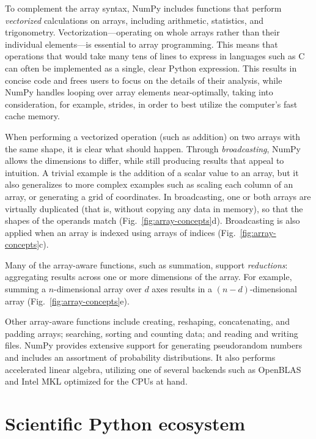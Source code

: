 To complement the array syntax, NumPy includes functions that perform
\emph{vectorized} calculations on arrays, including arithmetic, statistics, and
trigonometry.
Vectorization---operating on whole arrays rather than their individual
elements---is essential to array programming.
This means that operations that would take many tens of lines to express in
languages such as C can often be implemented as a single, clear Python
expression.
This results in concise code and frees users to focus on the details of
their analysis, while NumPy handles looping over array elements near-optimally,
taking into consideration, for example, strides, in order to best utilize the
computer's fast cache memory.

When performing a vectorized operation (such as addition) on two arrays with
the same shape, it is clear what should happen.
Through \emph{broadcasting}, NumPy allows the dimensions to differ, while
still producing results that appeal to intuition.
A trivial example is the addition of a scalar value to an array, but it also
generalizes to more complex examples such as scaling each column of an array,
or generating a grid of coordinates.
In broadcasting, one or both arrays are virtually duplicated (that is, without
copying any data in memory), so that the shapes of the operands match
(Fig.~\ref{fig:array-concepts}d).
Broadcasting is also applied when an array is indexed using arrays of
indices (Fig.~\ref{fig:array-concepts}c).

Many of the array-aware functions, such as summation, support \emph{reductions}: aggregating
results across one or more dimensions of the array.
For example, summing a $n$-dimensional array over $d$ axes results in a
$(n-d)$-dimensional array (Fig.~\ref{fig:array-concepts}e).

Other array-aware functions include creating, reshaping, concatenating, and padding
arrays; searching, sorting and counting data; and reading and writing files.
NumPy provides extensive support for generating pseudorandom numbers and
includes an assortment of probability distributions.
It also performs accelerated linear algebra, utilizing one of several backends
such as OpenBLAS \cite{wang2013augem,xianyi2012model} and Intel MKL optimized for the CPUs at hand.


\section*{Scientific Python ecosystem}

